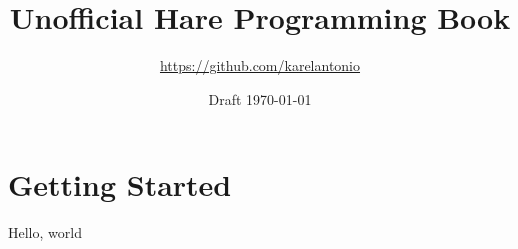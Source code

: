 \documentclass[oneside,14pt,a4paper,english]{book}
\date{ Draft \today }
\title {\Huge Unofficial Hare Programming Book}
\author {\Large \url {https://github.com/karelantonio} }
\begin{document}
\maketitle

\tableofcontents

\part {Getting Started}

Hello, world
\end{document}
